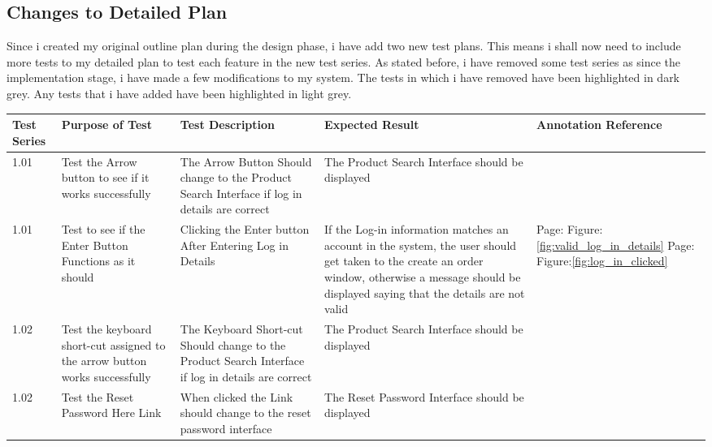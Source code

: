 \subsection{Changes to Detailed Plan}

Since i created my original outline plan during the design phase, i have add two new test plans. This means i shall now need to include more tests to my detailed plan to test each feature in the new test series. As stated before, i have removed some test series as since the implementation stage, i have made a few modifications to my system. The tests in which i have removed have been highlighted in dark grey. Any tests that i have added have been highlighted in light grey.

\begin{flushleft}
\begin{longtable}{|p{1cm}|p{2.5cm}|p{2.5cm}|p{2cm}|p{2cm}|}
        \hline
        \textbf{Test Series} & \textbf{Purpose of Test} & \textbf{Test Description} &  \textbf{Expected Result} & \textbf{Annotation Reference}\\ \hline
	\rowcolor{dark-grey}1.01 & Test the Arrow button to see if it works successfully & The Arrow Button Should change to the Product Search Interface if log in details are correct & The Product Search Interface should be displayed &  \\ \hline
	\rowcolor{light-grey}1.01 & Test to see if the Enter Button Functions as it should & Clicking the Enter button After Entering Log in Details & If the Log-in information matches an account in the system, the user should get taken to the create an order window, otherwise a message should be displayed saying that the details are not valid &  Page:\pageref{fig:valid_log_in_details}  \newline Figure:\ref{fig:valid_log_in_details}  \newline  \newline Page:\pageref{fig:log_in_clicked}  \newline Figure:\ref{fig:log_in_clicked} \\ \hline
	\rowcolor{dark-grey}1.02 & Test the keyboard short-cut assigned to the arrow button works successfully & The Keyboard Short-cut Should change to the Product Search Interface if log in details are correct &The Product Search Interface should be displayed &  \\ \hline
	1.02 & Test the Reset Password Here Link & When clicked the Link should change to the reset password interface  & The Reset Password Interface should be displayed &  \\ \hline

\end{longtable}
\end{flushleft}
